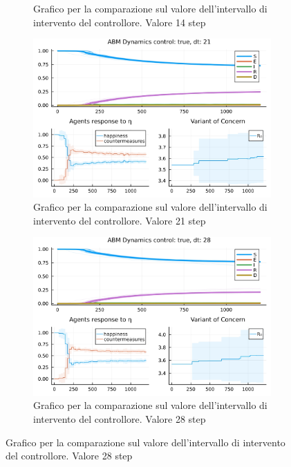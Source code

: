 \begin{figure}[!hb]
\begin{subfigure}[b]{0.45\textwidth}
		\caption{Grafico per la comparazione sul valore dell'intervallo di intervento del controllore. Valore 14 step}
		\label{fig:comparison_dt_14}
	\end{subfigure}
	\hfill
	\begin{subfigure}[b]{0.45\textwidth}
		\centering
		\includegraphics[width=\textwidth]{img/SocialNetworkABM_3_DT.jpg}
		\caption{Grafico per la comparazione sul valore dell'intervallo di intervento del controllore. Valore 21 step}
		\label{fig:comparison_dt_21}
	\end{subfigure}
	\hfill
	\begin{subfigure}[b]{0.45\textwidth}
		\centering
		\includegraphics[width=\textwidth]{img/SocialNetworkABM_4_DT.jpg}
		\caption{Grafico per la comparazione sul valore dell'intervallo di intervento del controllore. Valore 28 step}
		\label{fig:comparison_dt_28}
	\end{subfigure}
\end{figure}

